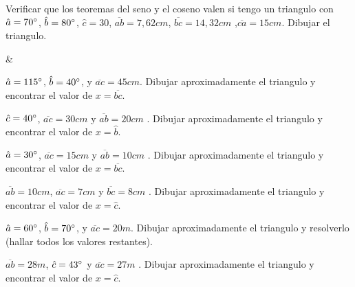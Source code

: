 \documentclass[a4paper,11pt,spanish,sans]{exam}
\begin{document}
\begin{enumerate}
\begin{minipage}{0.45\linewidth}


	\item  Verificar que los teoremas del seno y el coseno valen si tengo un triangulo con $\hat{a}=70\degree$, $\hat{b}=80\degree$, $\hat{c}=30$,  $\overline{ab}=7,62 cm$, $\overline{bc}=14,32cm$ ,$\overline{ca}=15cm$. Dibujar el triangulo. 
		
\end{minipage}
& $\qquad$
\begin{minipage}{0.45\linewidth}
	
		\item $\hat{a}=115\degree$, $\hat{b}=40\degree$, y $\overline{ac}=45cm$. Dibujar aproximadamente el triangulo y encontrar el valor de $x= \overline{bc}$.
		\item $\hat{c}=40\degree$,  $\overline{ac}=30cm$ y $\overline{ab}=20cm$ . Dibujar aproximadamente el triangulo y encontrar el valor de $x= \hat{b}$.
		\item $\hat{a}=30\degree$,  $\overline{ac}=15cm$ y $\overline{ab}=10cm$ . Dibujar aproximadamente el triangulo y encontrar el valor de $x= \overline{bc}$.
		\item $\overline{ab}=10cm$,  $\overline{ac}=7cm$ y $\overline{bc}=8cm$ . Dibujar aproximadamente el triangulo y encontrar el valor de $x= \hat{c}$.
		\item $\hat{a}=60\degree$, $\hat{b}=70\degree$, y $\overline{ac}=20m$. Dibujar aproximadamente el triangulo y resolverlo (hallar todos los valores restantes).
		\item $\overline{ab}=28m$,  $\hat{c}=43\degree$ y $\overline{ac}=27m$ . Dibujar aproximadamente el triangulo y encontrar el valor de $x= \hat{c}$.
		
		
\end{minipage}
\end{enumerate}
\end{document}

